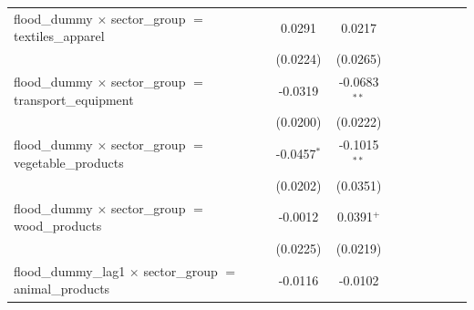\begin{tabular}{lcccccccc}
   flood\_dummy $\times$ sector\_group $=$ textiles\_apparel                      & 0.0291                & 0.0217                &                       &                       &                       &                       &                       &   \\   
                                                                                  & (0.0224)              & (0.0265)              &                       &                       &                       &                       &                       &   \\   
   flood\_dummy $\times$ sector\_group $=$ transport\_equipment                   & -0.0319               & -0.0683$^{**}$        &                       &                       &                       &                       &                       &   \\   
                                                                                  & (0.0200)              & (0.0222)              &                       &                       &                       &                       &                       &   \\   
   flood\_dummy $\times$ sector\_group $=$ vegetable\_products                    & -0.0457$^{*}$         & -0.1015$^{**}$        &                       &                       &                       &                       &                       &   \\   
                                                                                  & (0.0202)              & (0.0351)              &                       &                       &                       &                       &                       &   \\   
   flood\_dummy $\times$ sector\_group $=$ wood\_products                         & -0.0012               & 0.0391$^{+}$          &                       &                       &                       &                       &                       &   \\   
                                                                                  & (0.0225)              & (0.0219)              &                       &                       &                       &                       &                       &   \\   
   flood\_dummy\_lag1 $\times$ sector\_group $=$ animal\_products                 & -0.0116               & -0.0102               &                       &                       &                       &                       &                       &   \\   

\end{tabular}
